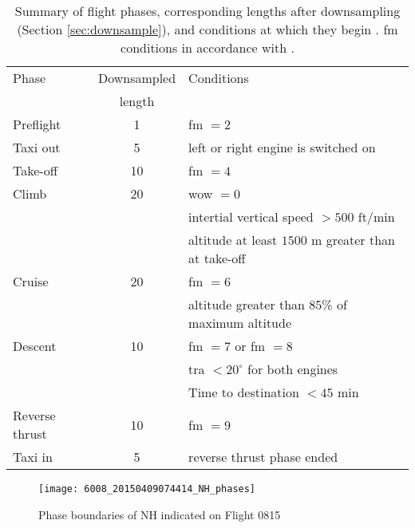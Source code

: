 \begin{table}
    \begin{center}
        \caption{\label{tab:flight_phases} Summary of flight phases, corresponding lengths after downsampling (Section \ref{sec:downsample}), and conditions at which they begin \cite[]{konig_br725stats_2018}. \ac{fm} conditions in accordance with \citet{reischl_br700-725a1-12_2014}.}
        \begin{tabular}{ l c l }
            Phase & Downsampled & Conditions \\ & length & \\
            \midrule
            Preflight & 1 & \ac{fm} \(= 2\) \\
            Taxi out & 5 & left or right engine is switched on \\
            Take-off & 10 & \ac{fm} \(= 4\) \\
            Climb & 20 & \ac{wow} \(= 0\) \\
            & & intertial vertical speed \(> 500\) \(\text{ft} / \text{min}\) \\
            & & altitude at least \(1500 \) m greater than at take-off \\
            Cruise & 20 & \ac{fm} \(= 6\) \\
            & & altitude greater than 85\% of maximum altitude \\
            Descent & 10 & \ac{fm} \(= 7\) or \ac{fm} \(= 8\) \\
            & & \ac{tra} \(< 20^{\circ} \) for both engines \\
            & & Time to destination \(< 45\) \(\text{min}\) \\
            Reverse thrust & 10 & \ac{fm} \(= 9\) \\
            Taxi in & 5 & reverse thrust phase ended
        \end{tabular}
    \end{center}
\end{table}

\begin{figure}
    \centering
    \texttt{[image: 6008\_20150409074414\_NH\_phases]}
    \caption{\label{fig:phases_example} Phase boundaries of NH indicated on Flight 0815}
\end{figure}

